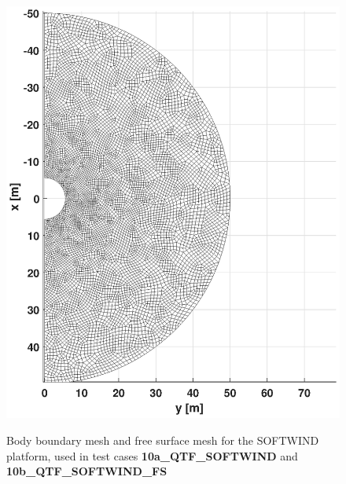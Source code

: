 \documentclass[12pt,a4paper,titlepage]{article}
\begin{document}
\begin{itemize}
\begin{figure}[h!tbp]
{\includegraphics[scale=0.45,trim = 120mm 8mm 170mm 16mm, clip]{figures/Softwind/FSmesh.eps}
}
\caption{Body boundary mesh and free surface mesh for the SOFTWIND platform, used in test cases \textbf{10a\_QTF\_SOFTWIND} and  \textbf{10b\_QTF\_SOFTWIND\_FS}}\label{fig:meshesSoftwind}
\end{figure}




\end{itemize}
\end{document}
